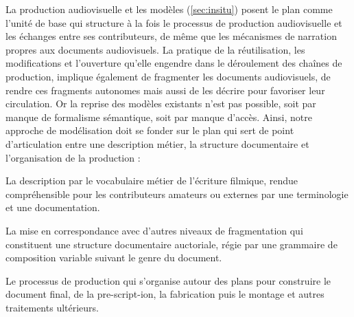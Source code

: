 % 
	La production audiovisuelle et les modèles  (\ref{sec:insitu}) posent le plan comme l'unité de base qui structure à la fois le processus de production audiovisuelle et les échanges entre ses contributeurs, de même que les mécanismes de narration propres aux documents audiovisuels.
	La pratique de la réutilisation, les modifications et l'ouverture qu'elle engendre dans le déroulement des chaînes de production, implique également de fragmenter les documents audiovisuels, de rendre ces fragments autonomes mais aussi de les décrire pour favoriser leur circulation.
	Or la reprise des modèles existants n'est pas possible, soit par manque de formalisme sémantique, soit par manque d'accès.
	Ainsi, notre approche de modélisation doit se fonder sur le plan qui sert de point d'articulation entre une description métier, la structure documentaire et l'organisation de la production : 
	\begin{liste}
		\item La description par le vocabulaire métier de l'écriture filmique, rendue compréhensible pour les contributeurs amateurs ou externes par une terminologie et une documentation.
		\item La mise en correspondance avec d'autres niveaux de fragmentation qui constituent une structure documentaire auctoriale, régie par une grammaire de composition variable suivant le genre du document.
		\item Le processus de production qui s'organise autour des plans pour construire le document final, de la pre-script-ion, la fabrication puis le montage et autres traitements ultérieurs.
	\end{liste}

